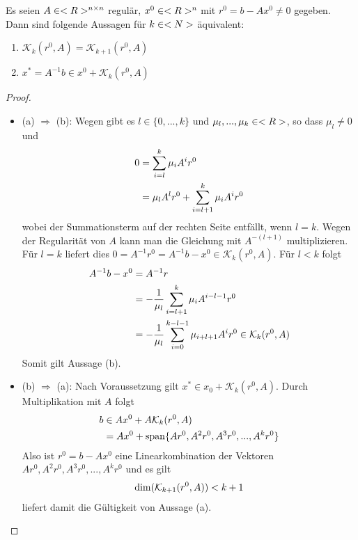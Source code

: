 \begin{proposition}
	Es seien $A\in<R>^{n \times n}$ regulär, $x^0\in<R>^n$ mit $r^0=b-Ax^0\neq 0$ gegeben. Dann sind folgende Aussagen für $k\in<N>$ äquivalent:
	\begin{enumerate}[label=(\alph*)]
		\item $\mathcal{K}_k(r^0,A) = \mathcal{K}_{k+1}(r^0,A)$
		\item $x^\ast = A^{-1}b\in x^0 + \mathcal{K}_k(r^0,A)$
	\end{enumerate}
\end{proposition}
\begin{proof}
	\begin{itemize}
		\item (a) $\Rightarrow$ (b): Wegen  gibt es $l\in\{0,...,k\}$ und $\mu_l,...,\mu_k\in<R>$, so dass $\mu_l\neq 0$ und
		\begin{align}
			0 &= \sum_{i=l}^{k} \mu_iA^ir^0 \notag \\
			&= \mu_lA^lr^0 + \sum_{i=l+1}^{k} \mu_iA^ir^0 \notag
		\end{align}
		wobei der Summationsterm auf der rechten Seite entfällt, wenn $l=k$. Wegen der Regularität von $A$ kann man die Gleichung mit $A^{-(l+1)}$ multiplizieren. Für $l=k$ liefert dies $0=A^{-1}r^0 = A^{-1}b-x^0\in\mathcal{K}_k(r^0,A)$. Für $l<k$ folgt
		\begin{align}
			A^{-1}b - x^0 &= A^{-1}r \notag \\
			&= -\frac{1}{\mu_l} \sum_{i=l+1}^k \mu_iA^{i-l-1}r ^0 \notag \\
			&= -\frac{1}{\mu_l}\sum_{i=0}^{k-l-1} \mu_{i+l+1}A^ir^0\in\mathcal{K}_k(r^0,A) \notag
		\end{align}
		Somit gilt Aussage (b).
		\item (b) $\Rightarrow$ (a): Nach Voraussetzung gilt $x^\ast\in x_0 + \mathcal{K}_k(r^0,A)$. Durch Multiplikation mit $A$ folgt
		\begin{align}
			b&\in Ax^0 + A\mathcal{K}_k(r^0,A)\notag \\
			&= Ax^0 + \operatorname{span}\{Ar^0,A^2r^0,A^3r^0,...,A^kr^0\}\notag
		\end{align}
		Also ist $r^0=b-Ax^0$ eine Linearkombination der Vektoren $Ar^0,A^2r^0,A^3r^0,...,A^kr^0$ und es gilt
		\begin{align}
			\dim(\mathcal{K}_{k+1}(r^0,A)) < k+1\notag
		\end{align}
		  liefert damit die Gültigkeit von Aussage (a).
	\end{itemize}
\end{proof}

